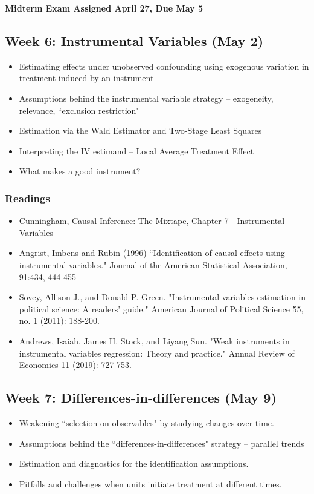 \documentclass[11pt, article, oneside]{memoir}
\theoremstyle{Assumption}
\begin{document}
\textbf{Midterm Exam Assigned April 27, Due May 5}

\subsection{Week 6: Instrumental Variables (May 2)}

\begin{itemize}
\item Estimating effects under unobserved confounding using exogenous variation in treatment induced by an instrument
\item Assumptions behind the instrumental variable strategy -- exogeneity, relevance, ``exclusion restriction"
\item Estimation via the Wald Estimator and Two-Stage Least Squares
\item Interpreting the IV estimand -- Local Average Treatment Effect 
\item What makes a good instrument?
\end{itemize}


\subsubsection*{Readings}

\begin{itemize}
\item Cunningham, Causal Inference: The Mixtape, Chapter 7 - Instrumental Variables
\item Angrist, Imbens and Rubin (1996) ``Identification of causal effects using instrumental variables." Journal of the American Statistical Association, 91:434, 444-455
\item Sovey, Allison J., and Donald P. Green. "Instrumental variables estimation in political science: A readers’ guide." American Journal of Political Science 55, no. 1 (2011): 188-200.
\item Andrews, Isaiah, James H. Stock, and Liyang Sun. "Weak instruments in instrumental variables regression: Theory and practice." Annual Review of Economics 11 (2019): 727-753.
\end{itemize}


\subsection{Week 7: Differences-in-differences (May 9)}

\begin{itemize}
\item Weakening ``selection on observables" by studying changes over time. 
\item Assumptions behind the ``differences-in-differences" strategy -- parallel trends
\item Estimation and diagnostics for the identification assumptions.
\item Pitfalls and challenges when units initiate treatment at different times. 
\end{itemize}
\end{document}
